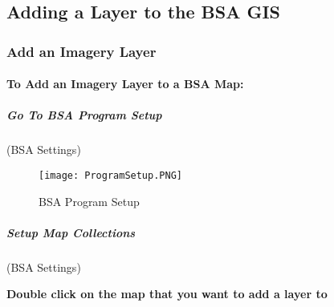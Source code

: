 \documentclass[class=article , crop=false, titlepage, twoside, multi={itemize, figure, verbatim}, float=false]{standalone}
\title{}  %
\begin{document}

\ifstandalone
\maketitle %
\clearpage
\fi

\subsection{Adding a Layer to the BSA GIS}

\subsubsection{Add an Imagery Layer}
\vspace{.25in}

\paragraph[Add imagery Layer]{To Add an Imagery Layer to a BSA Map:\texorpdfstring{\\}{}}


\subparagraph[BSA Program Setup ]{\Large Go To BSA Program Setup\texorpdfstring{\\}{}}
(BSA Settings)
\vspace{.5in}

\vspace{.5in}

%
%
\begin{figure}[h!]
\centering
    \texttt{[image: ProgramSetup.PNG]}
\caption{BSA Program Setup}
\end{figure}
\clearpage
%
%
%
\subparagraph[Setup Map Collections]{\Large Setup Map Collections\texorpdfstring{\\}{}}
(BSA Settings)
\vspace{.5in}

\vspace{.5in}

\noindent \textbf{Double click on the map that you want to add a layer to}
\vspace{.5in}
\end{document}
